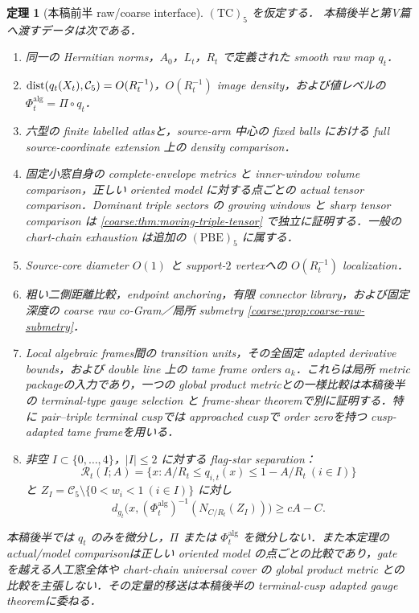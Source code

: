 \documentclass[a4paper,11pt]{ltjsarticle}
\numberwithin{equation}{section}
\theoremstyle{plain}
\newtheorem{theorem}{定理}[section]
\theoremstyle{definition}
\theoremstyle{remark}
\newcommand{\Cfive}{\mathcal C_5}\newcommand{\dsq}{d_{\square}}\newcommand{\Lt}{L_t}\newcommand{\Rt}{R_t}
\begin{document}
\begin{theorem}[本稿前半 raw/coarse interface]\label{coarse:thm:partI-interface}
$\mathrm{(TC)}_5$ を仮定する．
本稿後半と第V篇へ渡すデータは次である．
\begin{enumerate}[label=\textup{(I\arabic*)}]
\item 同一の Hermitian norms，$A_0$，$L_t$，$R_t$ で定義された smooth raw map $q_t$．
\item $\dist(q_t(X_t),\Cfive)=O(R_t^{-1})$，$O(R_t^{-1})$ image density，および値レベルの $\Phi_t^{\mathrm{alg}}=\Pi\circ q_t$．
\item 六型の finite labelled atlasと，source-arm 中心の fixed balls における full source-coordinate extension 上の density comparison．
\item 固定小窓自身の complete-envelope metrics と inner-window volume comparison，正しい oriented model に対する点ごとの actual tensor comparison．Dominant triple sectors の growing windows と sharp tensor comparison は \cref{coarse:thm:moving-triple-tensor} で独立に証明する．一般の chart-chain exhaustion は追加の $\mathrm{(PBE)}_5$ に属する．
\item Source-core diameter $O(1)$ と support-$2$ vertexへの $O(R_t^{-1})$ localization．
\item 粗い二側距離比較，endpoint anchoring，有限 connector library，および固定深度の coarse raw co-Gram／局所 submetry \cref{coarse:prop:coarse-raw-submetry}．
\item Local algebraic frames間の transition units，その全固定 adapted derivative bounds，および double line 上の tame frame orders $a_k$．これらは局所 metric packageの入力であり，一つの global product metricとの一様比較は本稿後半の terminal-type gauge selection と frame-shear theoremで別に証明する．特に pair--triple terminal cuspでは approached cuspで order zeroを持つ cusp-adapted tame frameを用いる．
\item 非空 $I\subset\{0,\ldots,4\}$，$|I|\le2$ に対する flag-star separation：
\[
 \mathcal R_t(I;A)=\{x:A/R_t\le q_{i,t}(x)\le1-A/R_t\ (i\in I)\}
\]
と $Z_I=\Cfive\setminus\{0<w_i<1\ (i\in I)\}$ に対し
\begin{equation}\label{coarse:eq:flag-star-separation}
 d_{g_t}\bigl(x,(\Phi_t^{\mathrm{alg}})^{-1}(N_{C/R_t}(Z_I))\bigr)
 \ge cA-C.
\end{equation}
\end{enumerate}
本稿後半では $q_t$ のみを微分し，$\Pi$ または $\Phi_t^{\mathrm{alg}}$ を微分しない．また本定理の actual/model comparisonは正しい oriented model の点ごとの比較であり，gate を越える人工窓全体や chart-chain universal cover の global product metric との比較を主張しない．その定量的移送は本稿後半の terminal-cusp adapted gauge theoremに委ねる．
\end{theorem}
\end{document}

